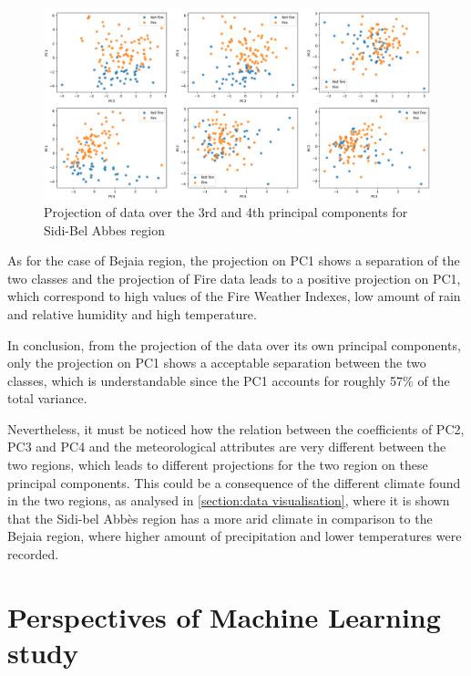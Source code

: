 \documentclass[10pt]{article}
\numberwithin{equation}{section}
\numberwithin{figure}{section}
\numberwithin{table}{section}
\begin{document}
\begin{figure}[H]
    \centering
    \includegraphics[width=\textwidth,height=\textheight,keepaspectratio]{Figures/projection PC second region.png}
    \caption{Projection of data over the 3rd and 4th principal components for Sidi-Bel Abbes region}
    \label{second_region_proj}
\end{figure}

As for the case of Bejaia region, the projection on PC1 shows a separation of the two classes and the projection of Fire data leads to a positive projection on PC1, which correspond to high values of the Fire Weather Indexes, low amount of rain and relative humidity and high temperature.

In conclusion, from the projection of the data over its own principal components, only the projection on PC1 shows a acceptable separation between the two classes, which is understandable since the PC1 accounts for roughly 57\% of the total variance.


Nevertheless, it must be noticed how the relation between the coefficients of PC2, PC3 and PC4 and the meteorological attributes are very different between the two regions, which leads to different projections for the two region on these principal components.
This could be a consequence of the different climate found in the two regions, as analysed in \autoref{section:data visualisation}, where it is shown that the Sidi-bel Abbès region has a more arid climate in comparison to the Bejaia region, where higher amount of precipitation and lower temperatures were recorded.














\section{Perspectives of Machine Learning study}
\label{Perspectives}
\end{document}
